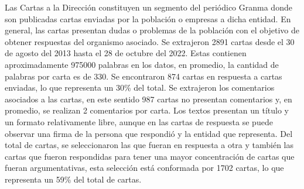 \documentclass[a4paper,11pt,twocolumn,twoside]{article}
\begin{document}
Las Cartas a la Dirección constituyen un segmento del periódico Granma donde son publicadas
cartas enviadas por la población o empresas a dicha entidad. En general, las cartas 
presentan dudas o problemas de la población con el objetivo de obtener respuestas del organismo
asociado. Se extrajeron 2891 cartas desde el 30 de agosto del 2013 hasta el 28 de octubre del 2022. Estas 
contienen aproximadamente 975000 palabras en los datos, en promedio, la cantidad de palabras por carta es de 330.
Se encontraron 874 cartas en respuesta a cartas enviadas, lo que representa un 30\% del total. Se extrajeron
los comentarios asociados a las cartas, en este sentido 987 cartas no presentan comentarios y, en promedio, 
se realizan 2 comentarios por carta. Los textos presentan un título y un formato relativamente libre, 
aunque en las cartas de respuesta se puede observar una firma de la persona que respondió y la entidad que 
representa. Del total de cartas, se seleccionaron las que fueran en respuesta a otra y también las 
cartas que fueron respondidas para tener una mayor concentración de cartas que fueran argumentativas, 
esta selección está conformada por 1702 cartas, lo que representa un 59\% del total de cartas.



\end{document}
